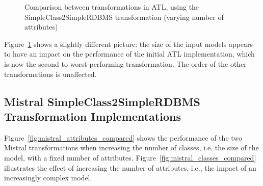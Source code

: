 \documentclass[12pt]{elsarticle}
\begin{document}
\begin{figure}[thb]
\centering
{}
\caption{Comparison between transformations in ATL, using the
SimpleClass2SimpleRDBMS transformation (varying number of
attributes)\label{fig:atl_classes_compared}}
\end{figure}

Figure~\ref{fig:atl_classes_compared} shows a slightly different picture: the
size of the input models appears to have an impact on the performance of the
initial ATL implementation, which is now the second to worst performing
transformation. The order of the other transformations is unaffected.

\subsection{Mistral SimpleClass2SimpleRDBMS Transformation Implementations}

Figure~\ref{fig:mistral_attributes_compared} shows the performance of the
two Mistral transformations when increasing the number of classes, i.e. the
size of the model, with a fixed number of attributes.
Figure~\ref{fig:mistral_classes_compared} illustrates the effect of increasing
the number of attributes, i.e., the impact of an increasingly complex model.
\end{document}

